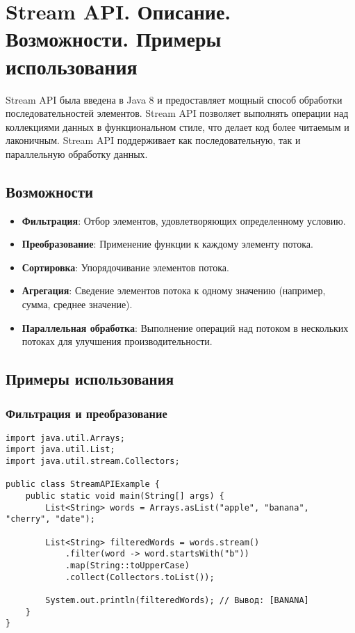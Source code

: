 \documentclass[12pt, a4paper]{article}
\begin{document}
\section{Stream API. Описание. Возможности. Примеры использования}
Stream API была введена в Java 8 и предоставляет мощный способ обработки последовательностей элементов. Stream API позволяет выполнять операции над коллекциями данных в функциональном стиле, что делает код более читаемым и лаконичным. Stream API поддерживает как последовательную, так и параллельную обработку данных.

\subsection*{Возможности}
\begin{itemize}
    \item \textbf{Фильтрация}: Отбор элементов, удовлетворяющих определенному условию.
    \item \textbf{Преобразование}: Применение функции к каждому элементу потока.
    \item \textbf{Сортировка}: Упорядочивание элементов потока.
    \item \textbf{Агрегация}: Сведение элементов потока к одному значению (например, сумма, среднее значение).
    \item \textbf{Параллельная обработка}: Выполнение операций над потоком в нескольких потоках для улучшения производительности.
\end{itemize}

\subsection*{Примеры использования}

\subsubsection*{Фильтрация и преобразование}
\begin{verbatim}
import java.util.Arrays;
import java.util.List;
import java.util.stream.Collectors;

public class StreamAPIExample {
    public static void main(String[] args) {
        List<String> words = Arrays.asList("apple", "banana", "cherry", "date");

        List<String> filteredWords = words.stream()
            .filter(word -> word.startsWith("b"))
            .map(String::toUpperCase)
            .collect(Collectors.toList());

        System.out.println(filteredWords); // Вывод: [BANANA]
    }
}
\end{verbatim}
\end{document}
